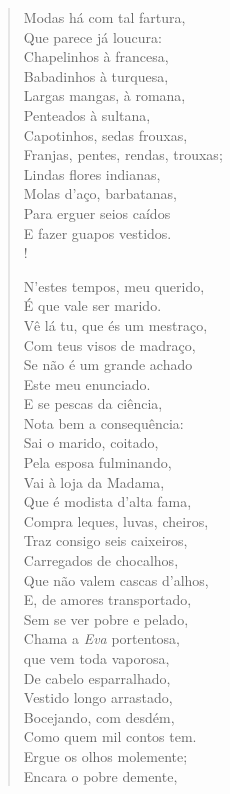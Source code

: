\begin{verse}
Modas há com tal fartura,\\
Que parece já loucura:\\
Chapelinhos à francesa,\\
Babadinhos à turquesa,\\
Largas mangas, à romana,\\
Penteados à sultana,\\
Capotinhos, sedas frouxas,\\
Franjas, pentes, rendas, trouxas;\\
Lindas flores indianas,\\
Molas d'aço, barbatanas,\\
Para erguer seios caídos\\
E fazer guapos vestidos.\\!

N'estes tempos, meu querido,\\
É que vale ser marido.\\
Vê lá tu, que és um mestraço,\\
Com teus visos de madraço,\\
Se não é um grande achado\\
Este meu enunciado.\\
E se pescas da ciência,\\
Nota bem a consequência:\\
Sai o marido, coitado,\\
Pela esposa fulminando,\\
Vai à loja da Madama,\\
Que é modista d'alta fama,\\
Compra leques, luvas, cheiros,\\
Traz consigo seis caixeiros,\\
Carregados de chocalhos,\\
Que não valem cascas d'alhos,\\
E, de amores transportado,\\
Sem se ver pobre e pelado,\\
Chama a \emph{Eva} portentosa,\\
que vem toda vaporosa,\\
De cabelo esparralhado,\\
Vestido longo arrastado,\\
Bocejando, com desdém,\\
Como quem mil contos tem.\\
Ergue os olhos molemente;\\
Encara o pobre demente,\\

\end{verse}
